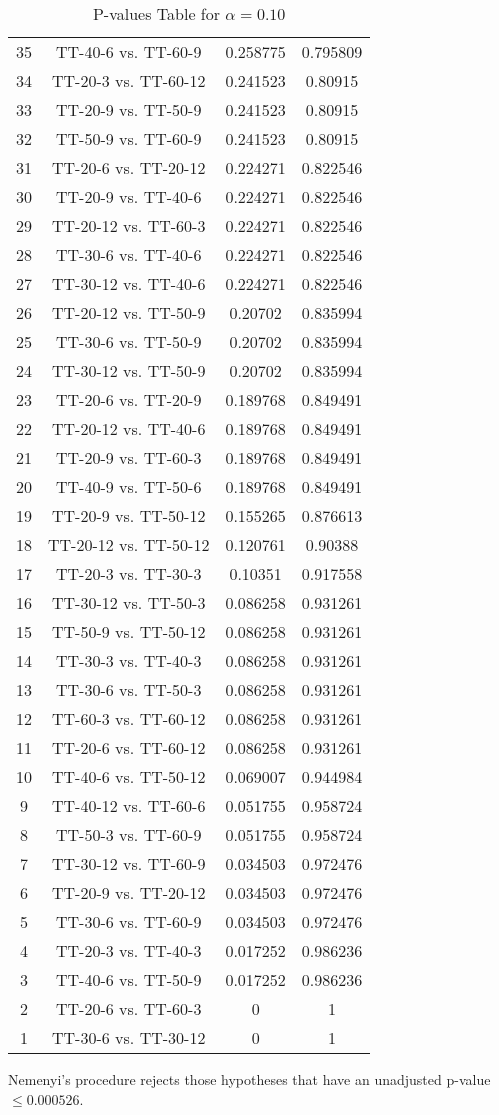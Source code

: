 \documentclass[a4paper,10pt]{article}
\begin{document}
\begin{landscape}
\begin{table}[!htp]
\begin{tabular}{cccc}
35&TT-40-6 vs. TT-60-9&0.258775&0.795809\\
34&TT-20-3 vs. TT-60-12&0.241523&0.80915\\
33&TT-20-9 vs. TT-50-9&0.241523&0.80915\\
32&TT-50-9 vs. TT-60-9&0.241523&0.80915\\
31&TT-20-6 vs. TT-20-12&0.224271&0.822546\\
30&TT-20-9 vs. TT-40-6&0.224271&0.822546\\
29&TT-20-12 vs. TT-60-3&0.224271&0.822546\\
28&TT-30-6 vs. TT-40-6&0.224271&0.822546\\
27&TT-30-12 vs. TT-40-6&0.224271&0.822546\\
26&TT-20-12 vs. TT-50-9&0.20702&0.835994\\
25&TT-30-6 vs. TT-50-9&0.20702&0.835994\\
24&TT-30-12 vs. TT-50-9&0.20702&0.835994\\
23&TT-20-6 vs. TT-20-9&0.189768&0.849491\\
22&TT-20-12 vs. TT-40-6&0.189768&0.849491\\
21&TT-20-9 vs. TT-60-3&0.189768&0.849491\\
20&TT-40-9 vs. TT-50-6&0.189768&0.849491\\
19&TT-20-9 vs. TT-50-12&0.155265&0.876613\\
18&TT-20-12 vs. TT-50-12&0.120761&0.90388\\
17&TT-20-3 vs. TT-30-3&0.10351&0.917558\\
16&TT-30-12 vs. TT-50-3&0.086258&0.931261\\
15&TT-50-9 vs. TT-50-12&0.086258&0.931261\\
14&TT-30-3 vs. TT-40-3&0.086258&0.931261\\
13&TT-30-6 vs. TT-50-3&0.086258&0.931261\\
12&TT-60-3 vs. TT-60-12&0.086258&0.931261\\
11&TT-20-6 vs. TT-60-12&0.086258&0.931261\\
10&TT-40-6 vs. TT-50-12&0.069007&0.944984\\
9&TT-40-12 vs. TT-60-6&0.051755&0.958724\\
8&TT-50-3 vs. TT-60-9&0.051755&0.958724\\
7&TT-30-12 vs. TT-60-9&0.034503&0.972476\\
6&TT-20-9 vs. TT-20-12&0.034503&0.972476\\
5&TT-30-6 vs. TT-60-9&0.034503&0.972476\\
4&TT-20-3 vs. TT-40-3&0.017252&0.986236\\
3&TT-40-6 vs. TT-50-9&0.017252&0.986236\\
2&TT-20-6 vs. TT-60-3&0&1\\
1&TT-30-6 vs. TT-30-12&0&1\\
\hline
\end{tabular}
\caption{P-values Table for $\alpha=0.10$}
\end{table}Nemenyi's procedure rejects those hypotheses that have an unadjusted p-value $\le0.000526$.


\end{landscape}
\end{document}
